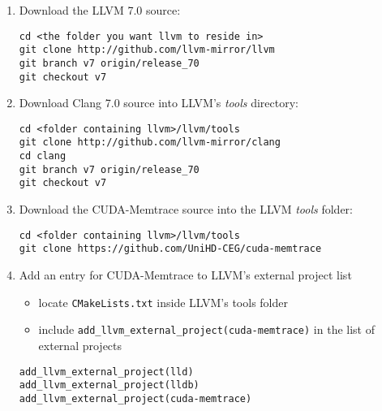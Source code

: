 \documentclass{scrartcl}
\begin{document}
\begin{enumerate}
	\item Download the LLVM 7.0 source:
\begin{lstlisting}[language=myLang]
cd <the folder you want llvm to reside in>
git clone http://github.com/llvm-mirror/llvm
git branch v7 origin/release_70
git checkout v7
\end{lstlisting}
	\item Download Clang 7.0 source into LLVM’s \textit{tools} directory:
\begin{lstlisting}[language=myLang]
cd <folder containing llvm>/llvm/tools
git clone http://github.com/llvm-mirror/clang
cd clang
git branch v7 origin/release_70
git checkout v7
\end{lstlisting}
	\item Download the CUDA-Memtrace source into the LLVM \textit{tools} folder:
\begin{lstlisting}[language=myLang]
cd <folder containing llvm>/llvm/tools
git clone https://github.com/UniHD-CEG/cuda-memtrace
\end{lstlisting}
    \item Add an entry for CUDA-Memtrace to LLVM's external project list
        \begin{itemize}
            \item locate \lstinline{CMakeLists.txt} inside LLVM's tools folder
            \item include \lstinline{add_llvm_external_project(cuda-memtrace)} in the list of external projects
        \end{itemize}
\begin{lstlisting}[firstnumber=47]
add_llvm_external_project(lld)
add_llvm_external_project(lldb)
add_llvm_external_project(cuda-memtrace)


\end{lstlisting}
\end{enumerate}
\end{document}
